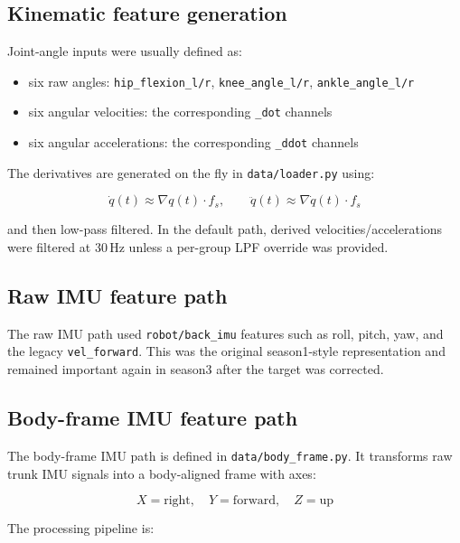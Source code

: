 \documentclass[11pt,a4paper]{article}
\begin{document}
\subsection{Kinematic feature generation}

Joint-angle inputs were usually defined as:

\begin{itemize}
\item six raw angles:
  \texttt{hip\_flexion\_l/r}, \texttt{knee\_angle\_l/r}, \texttt{ankle\_angle\_l/r}
\item six angular velocities:
  the corresponding \texttt{\_dot} channels
\item six angular accelerations:
  the corresponding \texttt{\_ddot} channels
\end{itemize}

The derivatives are generated on the fly in \texttt{data/loader.py} using:

\[
\dot{q}(t) \approx \nabla q(t)\cdot f_s,\qquad
\ddot{q}(t) \approx \nabla \dot{q}(t)\cdot f_s
\]

and then low-pass filtered. In the default path, derived velocities/accelerations were filtered at 30\,Hz unless a per-group LPF override was provided.

\subsection{Raw IMU feature path}

The raw IMU path used \texttt{robot/back\_imu} features such as roll, pitch, yaw, and the legacy \texttt{vel\_forward}. This was the original season1-style representation and remained important again in season3 after the target was corrected.

\subsection{Body-frame IMU feature path}

The body-frame IMU path is defined in \texttt{data/body\_frame.py}. It transforms raw trunk IMU signals into a body-aligned frame with axes:

\[
X=\text{right},\quad Y=\text{forward},\quad Z=\text{up}
\]

The processing pipeline is:
\end{document}
